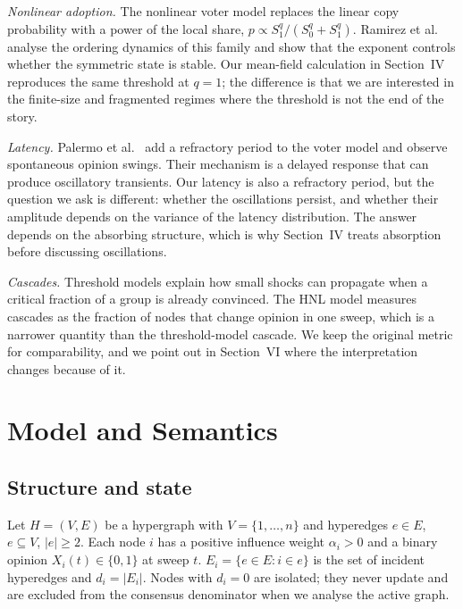 \documentclass[conference]{IEEEtran}
\begin{document}
\emph{Nonlinear adoption.} The nonlinear voter model replaces the linear copy probability with a power of the local share, $p\propto S_1^{q}/(S_0^{q}+S_1^{q})$. Ramirez et al.\ \cite{ramirez2023} analyse the ordering dynamics of this family and show that the exponent controls whether the symmetric state is stable. Our mean-field calculation in Section~IV reproduces the same threshold at $q=1$; the difference is that we are interested in the finite-size and fragmented regimes where the threshold is not the end of the story.

\emph{Latency.} Palermo et al.\ \cite{palermo2024} add a refractory period to the voter model and observe spontaneous opinion swings. Their mechanism is a delayed response that can produce oscillatory transients. Our latency is also a refractory period, but the question we ask is different: whether the oscillations persist, and whether their amplitude depends on the variance of the latency distribution. The answer depends on the absorbing structure, which is why Section~IV treats absorption before discussing oscillations.

\emph{Cascades.} Threshold models \cite{granovetter1978,easley2010} explain how small shocks can propagate when a critical fraction of a group is already convinced. The HNL model measures cascades as the fraction of nodes that change opinion in one sweep, which is a narrower quantity than the threshold-model cascade. We keep the original metric for comparability, and we point out in Section~VI where the interpretation changes because of it.

\section{Model and Semantics}

\subsection{Structure and state}
Let $H=(V,E)$ be a hypergraph with $V=\{1,\dots,n\}$ and hyperedges $e\in E$, $e\subseteq V$, $|e|\ge2$. Each node $i$ has a positive influence weight $\alpha_i>0$ and a binary opinion $X_i(t)\in\{0,1\}$ at sweep $t$. $E_i=\{e\in E:i\in e\}$ is the set of incident hyperedges and $d_i=|E_i|$. Nodes with $d_i=0$ are isolated; they never update and are excluded from the consensus denominator when we analyse the active graph.
\end{document}
